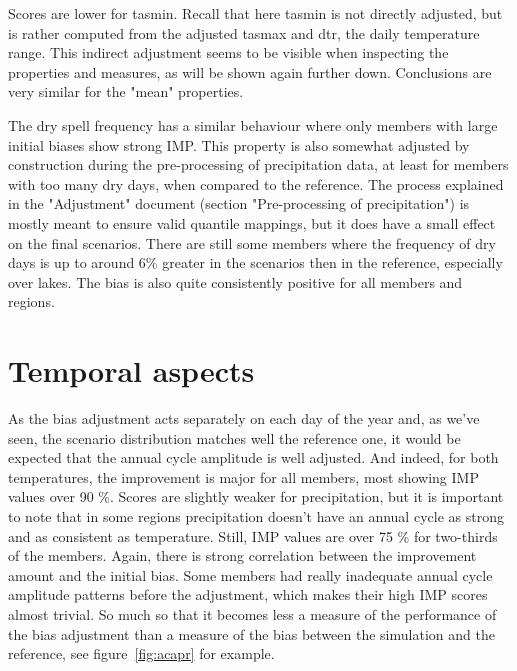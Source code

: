 \documentclass[letterpaper,10pt]{article}
\begin{document}
Scores are lower for tasmin. Recall that here tasmin is not directly adjusted, but is rather computed from the adjusted tasmax and dtr, the daily temperature range. This indirect adjustment seems to be visible when inspecting the properties and measures, as will be shown again further down. Conclusions are very similar for the "mean" properties.

The dry spell frequency has a similar behaviour where only members with large initial biases show strong IMP. This property is also somewhat adjusted by construction during the pre-processing of precipitation data, at least for members with too many dry days, when compared to the reference. The process explained in the "Adjustment" document (section "Pre-processing of precipitation") is mostly meant to ensure valid quantile mappings, but it does have a small effect on the final scenarios. There are still some members where the frequency of dry days is up to around 6\% greater in the scenarios then in the reference, especially over lakes. The bias is also quite consistently positive for all members and regions.

\section{Temporal aspects}
As the bias adjustment acts separately on each day of the year and, as we've seen, the scenario distribution matches well the reference one, it would be expected that the annual cycle amplitude is well adjusted. And indeed, for both temperatures, the improvement is major for all members, most showing IMP values over 90 \%. Scores are slightly weaker for precipitation, but it is important to note that in some regions precipitation doesn't have an annual cycle as strong and as consistent as temperature. Still, IMP values are over 75 \% for two-thirds of the members. Again, there is strong correlation between the improvement amount and the initial bias. Some members had really inadequate annual cycle amplitude patterns before the adjustment, which makes their high IMP scores almost trivial. So much so that it becomes less a measure of the performance of the bias adjustment than a measure of the bias between the simulation and the reference, see figure~\ref{fig:acapr} for example.
\end{document}
